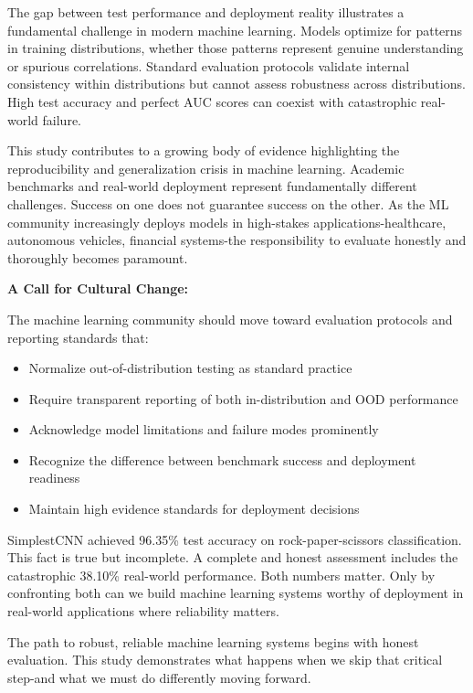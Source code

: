 \documentclass[12pt,a4paper]{article}
\begin{document}
The gap between test performance and deployment reality illustrates a fundamental challenge in modern machine learning. Models optimize for patterns in training distributions, whether those patterns represent genuine understanding or spurious correlations. Standard evaluation protocols validate internal consistency within distributions but cannot assess robustness across distributions. High test accuracy and perfect AUC scores can coexist with catastrophic real-world failure.

This study contributes to a growing body of evidence highlighting the reproducibility and generalization crisis in machine learning. Academic benchmarks and real-world deployment represent fundamentally different challenges. Success on one does not guarantee success on the other. As the ML community increasingly deploys models in high-stakes applications-healthcare, autonomous vehicles, financial systems-the responsibility to evaluate honestly and thoroughly becomes paramount.

\textbf{A Call for Cultural Change:}

The machine learning community should move toward evaluation protocols and reporting standards that:

\begin{itemize}
    \item Normalize out-of-distribution testing as standard practice
    \item Require transparent reporting of both in-distribution and OOD performance
    \item Acknowledge model limitations and failure modes prominently
    \item Recognize the difference between benchmark success and deployment readiness
    \item Maintain high evidence standards for deployment decisions
\end{itemize}

SimplestCNN achieved 96.35\% test accuracy on rock-paper-scissors classification. This fact is true but incomplete. A complete and honest assessment includes the catastrophic 38.10\% real-world performance. Both numbers matter. Only by confronting both can we build machine learning systems worthy of deployment in real-world applications where reliability matters.

The path to robust, reliable machine learning systems begins with honest evaluation. This study demonstrates what happens when we skip that critical step-and what we must do differently moving forward.
\end{document}
